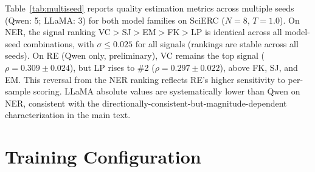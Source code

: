Table~\ref{tab:multiseed} reports quality estimation metrics across multiple seeds (Qwen: 5; LLaMA: 3) for both model families on SciERC ($N{=}8$, $T{=}1.0$).
On NER, the signal ranking VC${>}$SJ${>}$EM${>}$FK${>}$LP is identical across all model-seed combinations, with $\sigma{\leq}0.025$ for all signals (rankings are stable across all seeds).
On RE (Qwen only, preliminary), VC remains the top signal ($\rho{=}0.309{\pm}0.024$), but LP rises to \#2 ($\rho{=}0.297{\pm}0.022$), above FK, SJ, and EM. This reversal from the NER ranking reflects RE's higher sensitivity to per-sample scoring.
LLaMA absolute values are systematically lower than Qwen on NER, consistent with the directionally-consistent-but-magnitude-dependent characterization in the main text.

\begin{table}[t]
\centering
\small
\caption{Multi-seed quality estimation on SciERC ($N{=}8$, $T{=}1.0$; Qwen: 5 seeds (42, 123, 456, 2024, 3141); LLaMA: 3 seeds (42, 123, 456)). NER: both models; RE: Qwen only (preliminary). Signal ranking is stable across seeds ($\sigma{\leq}0.025$). $\sigma$ is population standard deviation over seeds.}
\label{tab:multiseed}
\end{table}

\section{Training Configuration}\label{app:training}

